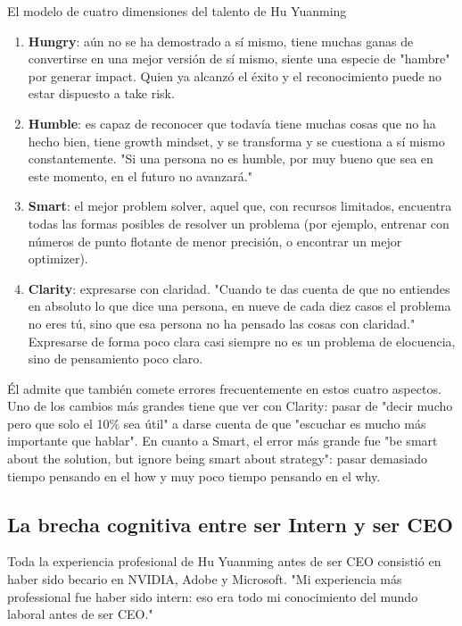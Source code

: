 \documentclass[a4paper]{article}
\begin{document}
\begin{importantbox}{El modelo de cuatro dimensiones del talento de Hu Yuanming}
\begin{enumerate}
\item \textbf{Hungry}: aún no se ha demostrado a sí mismo, tiene muchas ganas de convertirse en una mejor versión de sí mismo, siente una especie de "hambre" por generar impact. Quien ya alcanzó el éxito y el reconocimiento puede no estar dispuesto a take risk.
\item \textbf{Humble}: es capaz de reconocer que todavía tiene muchas cosas que no ha hecho bien, tiene growth mindset, y se transforma y se cuestiona a sí mismo constantemente. "Si una persona no es humble, por muy bueno que sea en este momento, en el futuro no avanzará."
\item \textbf{Smart}: el mejor problem solver, aquel que, con recursos limitados, encuentra todas las formas posibles de resolver un problema (por ejemplo, entrenar con números de punto flotante de menor precisión, o encontrar un mejor optimizer).
\item \textbf{Clarity}: expresarse con claridad. "Cuando te das cuenta de que no entiendes en absoluto lo que dice una persona, en nueve de cada diez casos el problema no eres tú, sino que esa persona no ha pensado las cosas con claridad." Expresarse de forma poco clara casi siempre no es un problema de elocuencia, sino de pensamiento poco claro.
\end{enumerate}
\end{importantbox}

Él admite que también comete errores frecuentemente en estos cuatro aspectos. Uno de los cambios más grandes tiene que ver con Clarity: pasar de "decir mucho pero que solo el 10\% sea útil" a darse cuenta de que "escuchar es mucho más importante que hablar". En cuanto a Smart, el error más grande fue "be smart about the solution, but ignore being smart about strategy": pasar demasiado tiempo pensando en el how y muy poco tiempo pensando en el why.

\subsection{La brecha cognitiva entre ser Intern y ser CEO}

Toda la experiencia profesional de Hu Yuanming antes de ser CEO consistió en haber sido becario en NVIDIA, Adobe y Microsoft. "Mi experiencia más professional fue haber sido intern: eso era todo mi conocimiento del mundo laboral antes de ser CEO."
\end{document}
